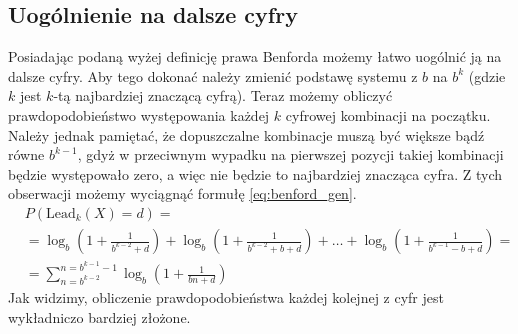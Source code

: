 \subsection{Uogólnienie na dalsze cyfry}
Posiadając podaną wyżej definicję prawa Benforda możemy łatwo uogólnić ją na dalsze cyfry. Aby tego dokonać należy zmienić podstawę systemu z $b$ na $b^{k}$ (gdzie $k$ jest $k$-tą najbardziej znaczącą cyfrą). Teraz możemy obliczyć prawdopodobieństwo występowania każdej $k$ cyfrowej kombinacji na początku. Należy jednak pamiętać, że dopuszczalne kombinacje muszą być większe bądź równe $b^{k-1}$, gdyż w przeciwnym wypadku na pierwszej pozycji takiej kombinacji będzie występowało zero, a więc nie będzie to najbardziej znacząca cyfra. Z tych obserwacji możemy wyciągnąć formułę \ref{eq:benford_gen}.
\begin{equation}
\label{eq:benford_gen}
    \begin{split}
        & P(\textrm{Lead}_k(X) = d) = \\
     & = \log_b\left(1+\frac{1}{b^{k-2}+d}\right) + \log_b\left(1+\frac{1}{b^{k-2}+b+d}\right) + \dots + \log_b\left(1+\frac{1}{b^{k-1}-b+d}\right) = \\
     & =  \sum_{n=b^{k-2}}^{n=b^{k-1}-1}\log_b\left(1+\frac{1}{b n+d}\right)
    \end{split}
\end{equation}
Jak widzimy, obliczenie prawdopodobieństwa każdej kolejnej z cyfr jest wykładniczo bardziej złożone.
